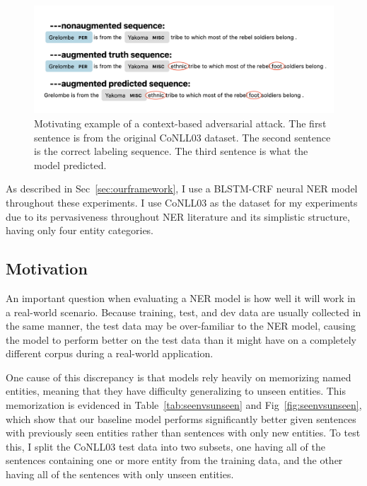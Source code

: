 \begin{figure}[h]
	\centering
	\includegraphics[width=0.95\linewidth]{LatexDiss/figures/insertmotivatingexample.png}
	\caption{Motivating example of a context-based adversarial attack. The first sentence is from the original CoNLL03 dataset. The second sentence is the correct labeling sequence. The third sentence is what the model predicted.}
	\label{fig:motivatingexampleinsert}
\end{figure}




As described in Sec~\ref{sec:ourframework}, I use a BLSTM-CRF neural NER model throughout these experiments. I use CoNLL03 as the dataset for my experiments due to its pervasiveness throughout NER literature and its simplistic structure, having only four entity categories.

\subsection{Motivation}
An important question when evaluating a NER model is how well it will work in a real-world scenario. Because training, test, and dev data are usually collected in the same manner, the test data may be over-familiar to the NER model, causing the model to perform better on the test data than it might have on a completely different corpus during a real-world application. 

One cause of this discrepancy is that models rely heavily on memorizing named entities, meaning that they have difficulty generalizing to unseen entities. This memorization is evidenced in Table~\ref{tab:seenvsunseen} and Fig~\ref{fig:seenvsunseen}, which show that our baseline model performs significantly better given sentences with previously seen entities rather than sentences with only new entities. To test this, I split the CoNLL03 test data into two subsets, one having all of the sentences containing one or more entity from the training data, and the other having all of the sentences with only unseen entities.

